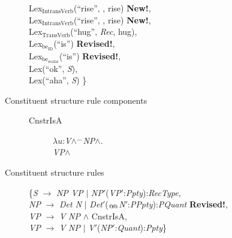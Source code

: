 \begin{description}
\begin{tabbing}
\> Lex$_{\mathrm{IntransVerb}}$(``rise'', ,
rise) \textbf{New!}, \\
\> Lex$_{\mathrm{IntransVerb}}$(``rise'', ,
rise) \textbf{New!}, \\
\> Lex$_{\mathrm{TransVerb}}$(``hug'', \textit{Rec}, hug), \\
\> Lex$_{\mathrm{be}_{\text{ID}}}$(``is'') \textbf{Revised!}, \\
\> Lex$_{\mathrm{be}_{\text{scalar}}}$(``is'') \textbf{Revised!}, \\
\> Lex(``ok'', \textit{S}),  \\
\> Lex(``aha'', \textit{S})  \}
\end{tabbing}

\item[Constituent structure rule components] \mbox{} 
  \begin{description}

    \item[\textnormal{CnstrIsA}] \mbox{}

  $\lambda
u$:\textit{V}\d{$\wedge$}$^{\frown}$\textit{NP}\d{$\wedge$}. \\
\hspace*{1em} \textit{VP}\d{$\wedge$} 

  \end{description}
  


\item[Constituent structure rules] \mbox{}
  
  \begin{tabbing}
    \{\=\textit{S} $\longrightarrow$ \textit{NP VP} $\mid$ \textit{NP}$'$(\textit{VP}$'$:\textit{Ppty}):\textit{RecType},\\
    \>\textit{NP} $\longrightarrow$ \textit{Det N} $\mid$
    \textit{Det}$'$($_{\text{@\!@}}$\textit{N}$'$:\textit{PPpty}):\textit{PQuant}
    \textbf{Revised!},\\
    \>\textit{VP} $\longrightarrow$ \textit{V} \textit{NP}
    \d{\d{$\wedge$}} CnstrIsA, \\
    \>\textit{VP} $\longrightarrow$ \textit{V} \textit{NP} $\mid$
    \textit{V}$'$(\textit{NP}$'$:\textit{Quant}):\textit{Ppty}\}

  \end{tabbing}

\end{description}
  


